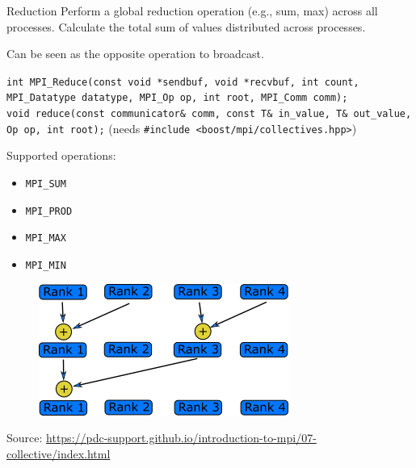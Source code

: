 \documentclass{beamer}
\begin{document}
\begin{frame}{Reduction}
  Perform a global reduction operation (e.g., sum, max) across all processes. Calculate the total sum of values distributed across processes.

  Can be seen as the opposite operation to broadcast.

  {
    \footnotesize
    \texttt{int MPI\_Reduce(const void *sendbuf, void *recvbuf, int count, MPI\_Datatype datatype, MPI\_Op op, int root, MPI\_Comm comm);} \\
    \texttt{void reduce(const communicator\& comm, const T\& in\_value, T\& out\_value, Op op, int root);} (needs \texttt{\#include <boost/mpi/collectives.hpp>})
  }

  \begin{minipage}[t]{0.2\textwidth}
    Supported operations:
    \begin{itemize}
      \item \texttt{MPI\_SUM}
      \item \texttt{MPI\_PROD}
      \item \texttt{MPI\_MAX}
      \item \texttt{MPI\_MIN}
    \end{itemize}
  \end{minipage}
  \hfill
  \begin{minipage}[t]{0.75\textwidth}
    \begin{figure}[h]
      \includegraphics[]{images/reduction.png}
    \end{figure}
  \end{minipage}
  {\footnotesize Source: \href{https://pdc-support.github.io/introduction-to-mpi/07-collective/index.html}{https://pdc-support.github.io/introduction-to-mpi/07-collective/index.html}}
\end{frame}
\end{document}
